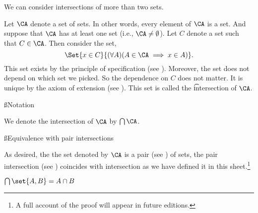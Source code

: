 

We can consider intersections of more than two sets.



Let $\CA$ denote a set of sets.
In other words, every element of $\CA$ is a set.
And suppose that $\CA$ has at least one set (i.e., $\CA \neq \emptyset$).
Let $C$ denote a set such that $C \in \CA$.
Then consider the set,
\[
	\Set{x \in C}{(\forall A)(A \in \CA \implies x \in A)}.
\]
This set exists by the principle of specification (see ).
Moreover, the set does not depend on which set we picked.
So the dependence on $C$ does not matter.
It is unique by the axiom of extension (see ).
This set is called the \t{intersection} of $\CA$.

\ss{Notation}

We denote the intersection of $\CA$ by $\bigcap \CA$.

\ss{Equivalence with pair intersections}

As desired, the the set denoted by $\CA$ is a pair (see ) of sets, the pair intersection (see ) coincides with intersection as we have defined it in this sheet.\footnote{A full account of the proof will appear in future editions.}

\begin{proposition}
  $\bigcap \set{A, B} = A \cap B$
\end{proposition}

\blankpage
